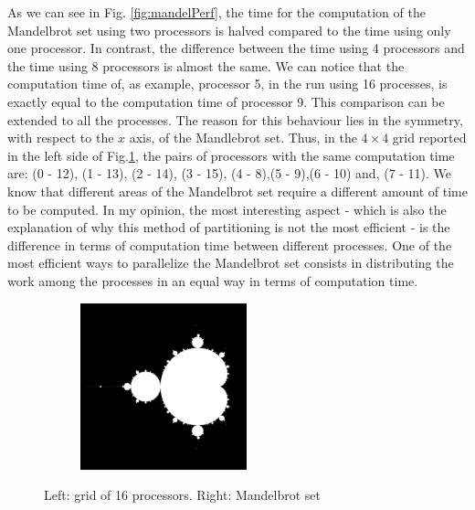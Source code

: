 \documentclass[unicode,11pt,a4paper,oneside,numbers=endperiod,openany]{scrartcl}
\begin{document}
As we can see in Fig. \ref{fig:mandelPerf}, the time for the computation of the Mandelbrot set using two processors is halved compared to the time using only one processor. In contrast, the difference between the time using 4 processors and the time using 8 processors is almost the same. We can notice that the computation time of, as example, processor 5, in the run using 16 processes, is exactly equal to the computation time of processor 9. This comparison can be extended to all the processes. The reason for this behaviour lies in the symmetry, with respect to the $x$ axis, of the Mandlebrot set. Thus, in the $4 \times 4$ grid reported in the left side of Fig.\ref{fig:procMatrix}, the pairs of processors with the same computation time are: (0 - 12), (1 - 13), (2 - 14), (3 - 15), (4 - 8),(5 - 9),(6 - 10) and, (7 - 11). We know that different areas of the Mandelbrot set require a different amount of time to be computed. In my opinion, the most interesting aspect - which is also the explanation of why this method of partitioning is not the most efficient - is the difference in terms of computation time between different processes. One of the most efficient ways to parallelize the Mandelbrot set consists in distributing the work among the processes in an equal way in terms of computation time.
\begin{figure}[h!]
	\centering
	\begin{subfigure}[b]{0.48\textwidth}
		\hspace{3cm}
	\end{subfigure}
	\hfill
	\begin{subfigure}[b]{0.48\textwidth}
		\includegraphics[width=0.53\textwidth]{images/mandel.png}
	\end{subfigure}
	\caption{Left: grid of 16 processors. Right: Mandelbrot set}
	\label{fig:procMatrix}
\end{figure}
\end{document}
